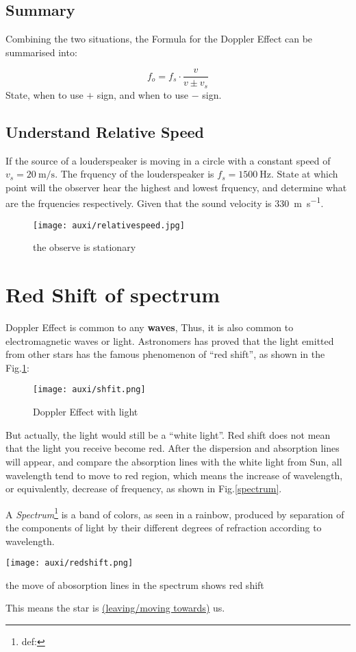 \documentclass[a4paper]{tufte-handout}
\newenvironment{SummBox}
{\begin{tcolorbox}[breakable,colback=r1!30,colframe=r1,title=Summary]} {\end{tcolorbox}}
\begin{document}
\subsection{Summary}
Combining the two situations, the Formula for the Doppler Effect can be summarised into:
\begin{SummBox}
\[
  f_o = f_s \cdot \frac{v}{v\pm v_s}
\]
State, when to use $+$ sign, and when to use $-$ sign.
\end{SummBox}

\subsection{Understand Relative Speed}
If the source of a louderspeaker is moving in a circle with a constant speed of $v_s=\SI{20}{\m\per\s}$. The frquency of the louderspeaker is $f_s=\SI{1500}{\hertz}$. State at which point will the observer hear the highest and lowest frquency, and determine what are the frquencies respectively. Given that the sound velocity is \SI{330}{\m\per\s}.
\begin{figure}[h]
\centering
\texttt{[image: auxi/relativespeed.jpg]}
\caption{the observe is stationary}
\end{figure}
\vspace{2in}

\section{Red Shift of spectrum}
Doppler Effect is common to any \textbf{waves}, Thus, it is also common to electromagnetic waves or light. Astronomers has proved that the light emitted from other stars has the famous phenomenon of ``red shift'', as shown in the Fig.\ref{fig:comic redshift}:
\begin{figure}[h]
\centering
\texttt{[image: auxi/shfit.png]}
\caption{Doppler Effect with light}
\label{fig:comic redshift}
\end{figure}
But actually, the light would still be a ``white light''. Red shift does not mean that the light you receive become red. After the dispersion and absorption lines will appear, and compare the absorption lines with the white light from Sun, all wavelength tend to move to red region, which means the increase of wavelength, or equivalently, decrease of frequency, as shown in Fig.\ref{spectrum}. 

A \emph{Spectrum}\footnote{def:} is a band of colors, as seen in a rainbow, produced by separation of the components of light by their different degrees of refraction according to wavelength.

\begin{marginfigure}
\texttt{[image: auxi/redshift.png]}
\caption{the move of abosorption lines in the spectrum shows red shift}
\label{spectrum}
\end{marginfigure}
This means the star is \uline{(leaving/moving towards)} us.
\end{document}
